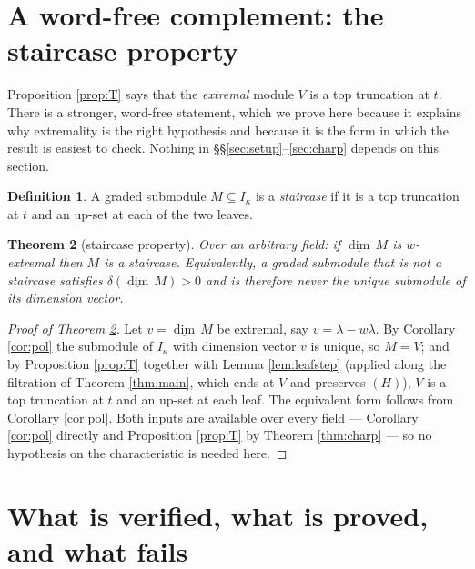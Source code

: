 \documentclass[reqno]{amsart}
\theoremstyle{plain}
\newtheorem{theorem}{Theorem}[section]
\theoremstyle{definition}
\newtheorem{definition}[theorem]{Definition}
\newcommand{\dimv}{\underline{\dim}\,}
\newcommand{\la}{\lambda}
\newcommand{\ka}{\kappa}
\begin{document}
\section{A word-free complement: the staircase property}\label{sec:staircase}

Proposition \ref{prop:T} says that the \emph{extremal} module $V$ is a top
truncation at $t$.  There is a stronger, word-free statement, which we prove
here because it explains why extremality is the right hypothesis and because it
is the form in which the result is easiest to check.  Nothing in
\S\S\ref{sec:setup}--\ref{sec:charp} depends on this section.

\begin{definition}\label{def:staircase}
A graded submodule $M\subseteq I_\ka$ is a \emph{staircase} if it is a top
truncation at $t$ and an up-set at each of the two leaves.
\end{definition}

\begin{theorem}[staircase property]\label{thm:staircase}
Over an arbitrary field: if $\dimv M$ is $w$-extremal then $M$ is a
staircase.  Equivalently, a graded submodule that is not a staircase satisfies
$\delta(\dimv M)>0$ and is therefore never the unique submodule of its
dimension vector.
\end{theorem}

\begin{proof}[Proof of Theorem \ref{thm:staircase}]
Let $v=\dimv M$ be extremal, say $v=\la-w\la$.  By Corollary \ref{cor:pol} the
submodule of $I_\ka$ with dimension vector $v$ is unique, so $M=V$; and by
Proposition \ref{prop:T} together with Lemma \ref{lem:leafstep} (applied along
the filtration of Theorem \ref{thm:main}, which ends at $V$ and preserves
$(H)$), $V$ is a top truncation at $t$ and an up-set at each leaf.  The
equivalent form follows from Corollary \ref{cor:pol}.  Both inputs are
available over every field --- Corollary \ref{cor:pol} directly and
Proposition \ref{prop:T} by Theorem \ref{thm:charp} --- so no hypothesis on
the characteristic is needed here.
\end{proof}

\section{What is verified, what is proved, and what fails}
\label{sec:verification}
\end{document}
